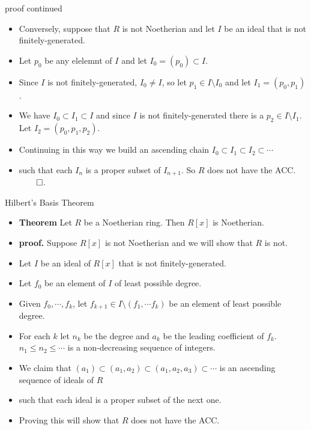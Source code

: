 \documentclass{beamer}
\begin{document}
\begin{frame}{proof continued}

\begin{itemize}
  \item Conversely, suppose that $R$ is not Noetherian and let $I$ be an ideal that is not finitely-generated.
  \item Let $p_0$ be any elelemnt of $I$ and let $I_0=(p_0)\subset I$.
  \item Since $I$ is not finitely-generated, $I_0\not= I$, so let $p_1 \in I\setminus I_0$ and let $I_1 = (p_0,p_1)$.
  \item We have $I_0 \subset I_1 \subset I$ and since $I$ is not finitely-generated there is a $p_2\in I\setminus I_1$. Let $I_2=(p_0,p_1,p_2)$.
  \item Continuing in this way we build an ascending chain $I_0 \subset  I_1 \subset I_2 \subset \cdots$
  \item such that each $I_n$ is a proper subset of $I_{n+1}$. So $R$ does not have the ACC. $\qed$.

\end{itemize}

\end{frame}



\begin{frame}{Hilbert's Basis Theorem}

\begin{itemize}
  \item \textbf{Theorem} Let $R$ be a Noetherian ring. Then $R[x]$ is Noetherian.
  \item \textbf{proof.} Suppose $R[x]$ is not Noetherian and we will show that $R$ is not.
  \item Let $I$ be an ideal of $R[x]$ that is not finitely-generated.
  \item Let $f_0$ be an element of $I$ of least possible degree.
  \item Given $f_0,\cdots, f_k$, let $f_{k+1} \in I\setminus (f_1,\cdots f_k)$ be an element of least possible degree.
  \item For each $k$ let $n_k$ be the degree and $a_k$ be the leading coefficient of $f_k$. $n_1 \leq n_2 \leq \cdots$ is a non-decreasing sequence of integers.
  \item We claim that $(a_1) \subset (a_1, a_2) \subset (a_1, a_2, a_3) \subset \cdots$ is an ascending sequence of ideals of $R$
  \item such that each ideal is a proper subset of the next one.
  \item Proving this will show that $R$ does not have the ACC.
\end{itemize}
\end{frame}
\end{document}
